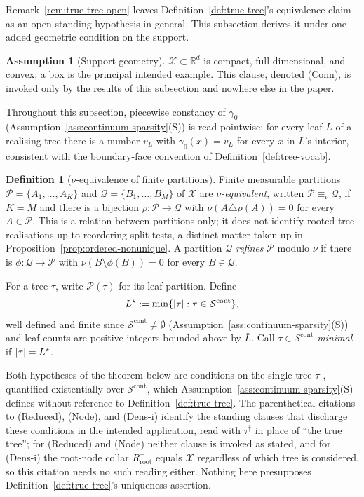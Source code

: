\documentclass[11pt]{article}
\theoremstyle{plain}
\theoremstyle{definition}
\newtheorem{assumption}{Assumption}
\newtheorem{definition}[theorem]{Definition}
\theoremstyle{remark}
\newcommand{\R}{\mathbb{R}}
\newcommand{\cX}{\mathcal{X}}
\newcommand{\cS}{\mathcal{S}}
\newcommand{\cP}{\mathcal{P}}
\newcommand{\cQ}{\mathcal{Q}}
\DeclarePairedDelimiter{\card}{\lvert}{\rvert}
\begin{document}
Remark~\ref{rem:true-tree-open} leaves Definition~\ref{def:true-tree}'s
equivalence claim as an open standing hypothesis in general. This subsection
derives it under one added geometric condition on the support.

\begin{assumption}[Support geometry]\label{ass:support-geometry}
\(\cX\subset\R^d\) is compact, full-dimensional, and convex; a box is the
principal intended example. This clause, denoted (Conn), is invoked only by
the results of this subsection and nowhere else in the paper.
\end{assumption}

Throughout this subsection, piecewise constancy of \(\gamma_0\)
(Assumption~\ref{ass:continuum-sparsity}(S)) is read pointwise: for every
leaf \(L\) of a realising tree there is a number \(v_L\) with
\(\gamma_0(x)=v_L\) for every \(x\) in \(L\)'s interior, consistent with the
boundary-face convention of Definition~\ref{def:tree-vocab}.

\begin{definition}[\(\nu\)-equivalence of finite partitions]\label{def:nu-equivalence}
Finite measurable partitions \(\cP=\{A_1,\ldots,A_K\}\) and
\(\cQ=\{B_1,\ldots,B_M\}\) of \(\cX\) are \(\nu\)\emph{-equivalent},
written \(\cP\equiv_\nu\cQ\), if \(K=M\) and there is a bijection
\(\rho:\cP\to\cQ\) with \(\nu(A\triangle\rho(A))=0\) for every
\(A\in\cP\). This is a relation between partitions only; it does not
identify rooted-tree realisations up to reordering split tests, a distinct
matter taken up in Proposition~\ref{prop:ordered-nonunique}. A partition
\(\cQ\) \emph{refines} \(\cP\) modulo \(\nu\) if there is
\(\phi:\cQ\to\cP\) with \(\nu(B\setminus\phi(B))=0\) for every
\(B\in\cQ\).
\end{definition}

For a tree \(\tau\), write \(\cP(\tau)\) for its leaf partition. Define
\[
L^\star:=\min\{\card\tau:\tau\in\cS^{\mathrm{cont}}\},
\]
well defined and finite since \(\cS^{\mathrm{cont}}\ne\emptyset\)
(Assumption~\ref{ass:continuum-sparsity}(S)) and leaf counts are positive
integers bounded above by \(\bar L\). Call \(\tau\in\cS^{\mathrm{cont}}\)
\emph{minimal} if \(\card\tau=L^\star\).

Both hypotheses of the theorem below are conditions on the single tree
\(\tau^{\dagger}\), quantified existentially over \(\cS^{\mathrm{cont}}\),
which Assumption~\ref{ass:continuum-sparsity}(S) defines without reference
to Definition~\ref{def:true-tree}. The parenthetical citations to
(Reduced), (Node), and (Dens-i) identify the standing clauses that
discharge these conditions in the intended application, read with
\(\tau^{\dagger}\) in place of ``the true tree''; for (Reduced) and (Node)
neither clause is invoked as stated, and for (Dens-i) the root-node collar
\(R_{\mathrm{root}}^+\) equals \(\cX\) regardless of which tree is
considered, so this citation needs no such reading either. Nothing here
presupposes Definition~\ref{def:true-tree}'s uniqueness assertion.
\end{document}
